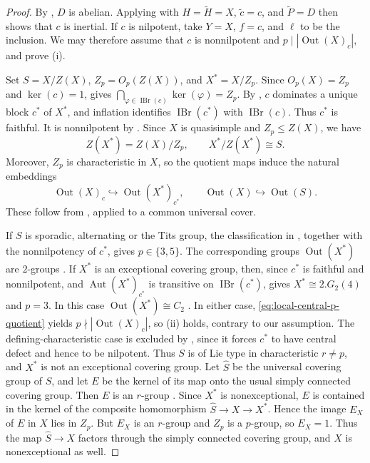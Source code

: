 \documentclass[11pt,a4paper]{article}
\theoremstyle{definition}
\theoremstyle{remark}
\numberwithin{equation}{section}
\DeclareMathOperator{\IBr}{IBr}
\DeclareMathOperator{\Aut}{Aut}
\DeclareMathOperator{\Out}{Out}
\begin{document}
	\begin{proof}
		By \cite[Proposition~1.2]{JiangZhangZhou2026}, $D$ is abelian. Applying
		\cite[Proposition~4.1]{JiangZhangZhou2026} with $H=\widetilde H=X$,
		$\widetilde c=c$, and $\widetilde P=D$ then shows that $c$ is inertial.
		If $c$ is nilpotent, take
		$Y=X$, $f=c$, and $\ell$ to be the inclusion. We may therefore
		assume that $c$ is nonnilpotent and $p\mid|\Out(X)_c|$, and prove (i).
		
		Set $S=X/Z(X)$, $Z_p=O_p(Z(X))$, and $X^*=X/Z_p$.
		Since $O_p(X)=Z_p$ and $\ker(c)=1$, \cite[Corollary~6.12]{Navarro1998} gives
		$\bigcap_{\varphi\in\IBr(c)}\ker(\varphi)=Z_p$. By
		\cite[Theorem~9.10]{Navarro1998}, $c$ dominates a unique block
		$c^*$ of $X^*$, and inflation identifies $\IBr(c^*)$ with $\IBr(c)$.
		Thus $c^*$ is faithful. It is nonnilpotent by
		\cite[Proposition~2.7]{AnEaton2013}.
		Since $X$ is quasisimple and $Z_p\leq Z(X)$, we have
		\[
		Z(X^*)=Z(X)/Z_p,\qquad X^*/Z(X^*)\cong S.
		\]
		Moreover, $Z_p$ is characteristic in $X$, so the quotient maps
		induce the natural embeddings
		\begin{equation}\label{eq:local-central-p-quotient}
			\Out(X)_c\hookrightarrow\Out(X^*)_{c^*},\qquad
			\Out(X)\hookrightarrow\Out(S).
		\end{equation}
		These follow from \cite[Corollary~B.8]{Navarro2018}, applied to a common
		universal cover.
		
		If $S$ is sporadic, alternating or the Tits group, the classification
		in \cite[Proposition~2.6 and Theorem~2.8]{MalleNavarroSpath2018}, together
		with the nonnilpotency of $c^*$, gives $p\in\{3,5\}$.
		The corresponding groups $\Out(X^*)$ are $2$-groups \cite[proof of Lemma~4.3]{JiangZhangZhou2026}.
		If $X^*$ is an exceptional covering group, then, since $c^*$ is
		faithful and nonnilpotent, and $\Aut(X^*)_{c^*}$ is transitive on
		$\IBr(c^*)$,
		\cite[Proposition~2.11]{MalleNavarroSpath2018} gives $X^*\cong 2.G_2(4)$ and $p=3$.
		In this case $\Out(X^*)\cong C_2$ \cite[p.~97]{ConwayEtAl1985}.
		In either case, \eqref{eq:local-central-p-quotient} yields
		$p\nmid|\Out(X)_c|$, so (ii) holds, contrary to our assumption.
		The defining-characteristic case is excluded by
		\cite[Proposition~3.1]{MalleNavarroSpath2018}, since it forces $c^*$ to have central
		defect and hence to be nilpotent. Thus $S$ is of Lie type in
		characteristic $r\ne p$, and $X^*$ is not an exceptional covering
		group. Let $\widehat S$ be the universal covering group of $S$,
		and let $E$ be the kernel of its map onto the usual simply connected
		covering group. Then $E$ is an $r$-group \cite[p.~6 of the author manuscript]{FengEtAl2019}.
		Since $X^*$ is nonexceptional, $E$ is contained in the kernel of
		the composite homomorphism $\widehat S\longrightarrow X\longrightarrow X^*$.
		Hence the image $E_X$ of $E$ in $X$ lies in $Z_p$.
		But $E_X$ is an $r$-group and $Z_p$ is a $p$-group, so $E_X=1$.
		Thus the map $\widehat S\longrightarrow X$ factors through the
		simply connected covering group, and $X$ is nonexceptional as well.
		

\end{proof}
\end{document}
